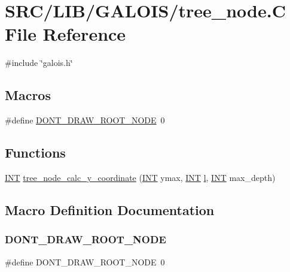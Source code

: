 \hypertarget{tree__node_8_c}{}\section{S\+R\+C/\+L\+I\+B/\+G\+A\+L\+O\+I\+S/tree\+\_\+node.C File Reference}
\label{tree__node_8_c}
{\ttfamily \#include \char`\"{}galois.\+h\char`\"{}}\newline
\subsection*{Macros}
\begin{DoxyCompactItemize}
\item 
\#define \mbox{\hyperlink{tree__node_8_c_ab21dfaea9f76c4462eb942ce14658e44}{D\+O\+N\+T\+\_\+\+D\+R\+A\+W\+\_\+\+R\+O\+O\+T\+\_\+\+N\+O\+DE}}~0
\end{DoxyCompactItemize}
\subsection*{Functions}
\begin{DoxyCompactItemize}
\item 
\mbox{\hyperlink{galois_8h_a09fddde158a3a20bd2dcadb609de11dc}{I\+NT}} \mbox{\hyperlink{tree__node_8_c_a90fd31502ff6159142ddb0a966be9015}{tree\+\_\+node\+\_\+calc\+\_\+y\+\_\+coordinate}} (\mbox{\hyperlink{galois_8h_a09fddde158a3a20bd2dcadb609de11dc}{I\+NT}} ymax, \mbox{\hyperlink{galois_8h_a09fddde158a3a20bd2dcadb609de11dc}{I\+NT}} \mbox{\hyperlink{alphabet2_8_c_a89606eca6b563ec68d2da2e84657736f}{l}}, \mbox{\hyperlink{galois_8h_a09fddde158a3a20bd2dcadb609de11dc}{I\+NT}} max\+\_\+depth)
\end{DoxyCompactItemize}


\subsection{Macro Definition Documentation}
\mbox{\label{tree__node_8_c_ab21dfaea9f76c4462eb942ce14658e44}} 
\subsubsection{\texorpdfstring{D\+O\+N\+T\+\_\+\+D\+R\+A\+W\+\_\+\+R\+O\+O\+T\+\_\+\+N\+O\+DE}{DONT\_DRAW\_ROOT\_NODE}}
{\footnotesize\ttfamily \#define D\+O\+N\+T\+\_\+\+D\+R\+A\+W\+\_\+\+R\+O\+O\+T\+\_\+\+N\+O\+DE~0}



